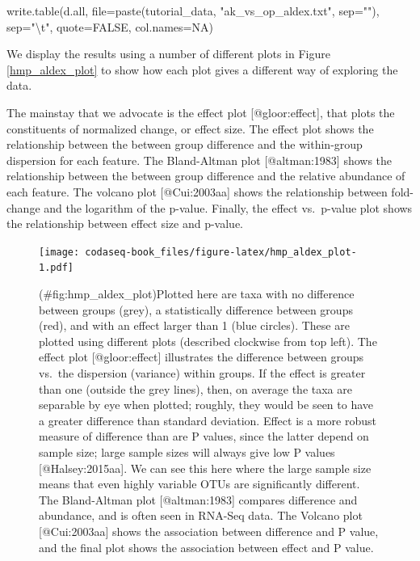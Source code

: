 \documentclass[
  onecolumn]{article}
\newenvironment{Shaded}{\begin{snugshade}}{\end{snugshade}}
\newcommand{\AttributeTok}[1]{\textcolor[rgb]{0.77,0.63,0.00}{#1}}
\newcommand{\ConstantTok}[1]{\textcolor[rgb]{0.00,0.00,0.00}{#1}}
\newcommand{\FunctionTok}[1]{\textcolor[rgb]{0.00,0.00,0.00}{#1}}
\newcommand{\NormalTok}[1]{#1}
\newcommand{\SpecialCharTok}[1]{\textcolor[rgb]{0.00,0.00,0.00}{#1}}
\newcommand{\StringTok}[1]{\textcolor[rgb]{0.31,0.60,0.02}{#1}}
\begin{document}
\begin{Shaded}
\begin{Highlighting}[]
\FunctionTok{write.table}\NormalTok{(d.all, }\AttributeTok{file=}\FunctionTok{paste}\NormalTok{(tutorial\_data, }\StringTok{"ak\_vs\_op\_aldex.txt"}\NormalTok{, }\AttributeTok{sep=}\StringTok{""}\NormalTok{), }\AttributeTok{sep=}\StringTok{"}\SpecialCharTok{\textbackslash{}t}\StringTok{"}\NormalTok{,}
    \AttributeTok{quote=}\ConstantTok{FALSE}\NormalTok{, }\AttributeTok{col.names=}\ConstantTok{NA}\NormalTok{)}
\end{Highlighting}
\end{Shaded}

We display the results using a number of different plots in Figure \ref{hmp_aldex_plot} to show how each plot gives a different way of exploring the data.

The mainstay that we advocate is the effect plot {[}@gloor:effect{]}, that plots the constituents of normalized change, or effect size. The effect plot shows the relationship between the between group difference and the within-group dispersion for each feature. The Bland-Altman plot {[}@altman:1983{]} shows the relationship between the between group difference and the relative abundance of each feature. The volcano plot {[}@Cui:2003aa{]} shows the relationship between fold-change and the logarithm of the p-value. Finally, the effect vs.~p-value plot shows the relationship between effect size and p-value.

\begin{figure}
\centering
\texttt{[image: codaseq-book\_files/figure-latex/hmp\_aldex\_plot-1.pdf]}
\caption{(\#fig:hmp\_aldex\_plot)Plotted here are taxa with no difference between groups (grey), a statistically difference between groups (red), and with an effect larger than 1 (blue circles). These are plotted using different plots (described clockwise from top left). The effect plot {[}@gloor:effect{]} illustrates the difference between groups vs.~the dispersion (variance) within groups. If the effect is greater than one (outside the grey lines), then, on average the taxa are separable by eye when plotted; roughly, they would be seen to have a greater difference than standard deviation. Effect is a more robust measure of difference than are P values, since the latter depend on sample size; large sample sizes will always give low P values {[}@Halsey:2015aa{]}. We can see this here where the large sample size means that even highly variable OTUs are significantly different. The Bland-Altman plot {[}@altman:1983{]} compares difference and abundance, and is often seen in RNA-Seq data. The Volcano plot {[}@Cui:2003aa{]} shows the association between difference and P value, and the final plot shows the association between effect and P value.}
\end{figure}
\end{document}
